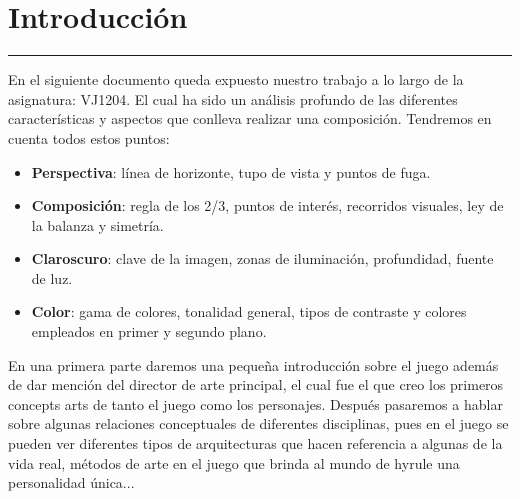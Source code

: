 \documentclass[12pt]{article}
\begin{document}
\newpage
\newpage
\renewcommand{\listfigurename}{Lita de figuras}
\thispagestyle{empty}
\listoffigures


\newpage
\section{Introducción}
    \hrule
\vspace{1cm}
    En el siguiente documento queda expuesto nuestro trabajo a lo largo de la asignatura: VJ1204. El cual ha sido un análisis profundo de las diferentes características y aspectos que conlleva realizar una composición. Tendremos en cuenta todos estos puntos:
    \begin{itemize}
        \item \textbf{Perspectiva}: línea de horizonte, tupo de vista y puntos de fuga.
        \item \textbf{Composición}: regla de los 2/3, puntos de interés, recorridos visuales, ley de la balanza y simetría.
        \item \textbf{Claroscuro}: clave de la imagen, zonas de iluminación, profundidad, fuente de luz.
        \item \textbf{Color}: gama de colores, tonalidad general, tipos de contraste y colores empleados en primer y segundo plano.
    \end{itemize}

    En una primera parte daremos una pequeña introducción sobre el juego además de dar mención del director de arte principal, el cual fue el que creo los primeros concepts arts de tanto el juego como los personajes. Después pasaremos a hablar sobre algunas relaciones conceptuales de diferentes disciplinas, pues en el juego se pueden ver diferentes tipos de arquitecturas que hacen referencia a algunas de la vida real, métodos de arte en el juego que brinda al mundo de hyrule una personalidad única...
\end{document}
